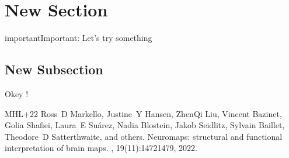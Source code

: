 \documentclass[letterpaper,10pt,english]{sphinxmanual}
\begin{document}
\chapter{New Section}
\label{\detokenize{Project Development:new-section}}\label{\detokenize{Project Development::doc}}
\begin{sphinxadmonition}{important}{Important:}
\sphinxAtStartPar
Let’s try something
\end{sphinxadmonition}


\section{New Subsection}
\label{\detokenize{Project Development:new-subsection}}
\sphinxAtStartPar
Okey !

\begin{sphinxthebibliography}{MHL+22}
\sphinxAtStartPar
Ross D Markello, Justine Y Hansen, Zhen\sphinxhyphen{}Qi Liu, Vincent Bazinet, Golia Shafiei, Laura E Suárez, Nadia Blostein, Jakob Seidlitz, Sylvain Baillet, Theodore D Satterthwaite, and others. Neuromaps: structural and functional interpretation of brain maps. , 19(11):1472\textendash{}1479, 2022.
\end{sphinxthebibliography}



\renewcommand{\indexname}{Index}
\printindex
\end{document}
